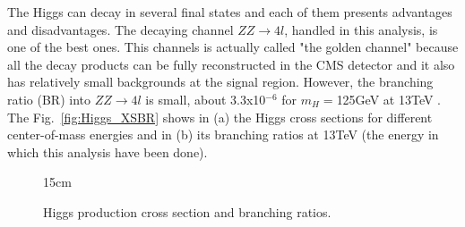 The Higgs can decay in several final states and each of them presents advantages and disadvantages. The decaying channel $ZZ \rightarrow 4l$, handled in this analysis, is one of the best ones. This channels is actually called "the golden channel" because all the decay products can be fully reconstructed in the CMS detector and it also has relatively small backgrounds at the signal region. However, the branching ratio (BR) into $ZZ \rightarrow 4l$ is small, about 3.3x10$^{-6}$ for $m_{H} = $125GeV at 13TeV \cite{bib:LHC-Higgs-XSWG-2018}. The Fig.~\ref{fig:Higgs_XSBR} shows in (a) the Higgs cross sections for different center-of-mass energies and in (b) its branching ratios at 13TeV (the energy in which this analysis have been done).

\begin{figure}[htbp]{15cm}
	\caption{Higgs production cross section and branching ratios.}
	\quad

\end{figure}
